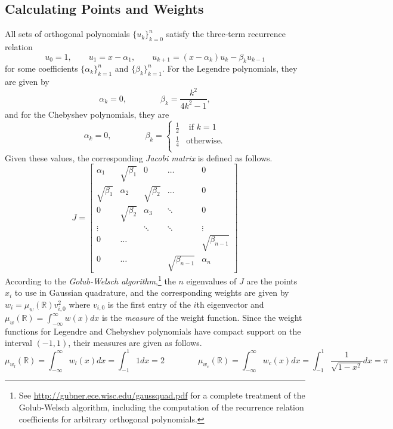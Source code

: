 \subsection*{Calculating Points and Weights} %


All sets of orthogonal polynomials $\{u_k\}_{k=0}^{n}$ satisfy the three-term recurrence relation
\[
u_0=1,\qquad u_1 = x - \alpha_1,\qquad u_{k+1} = (x-\alpha_k)u_k - \beta_ku_{k-1}
\]
for some coefficients $\{\alpha_k\}_{k=1}^n$ and $\{\beta_k\}_{k=1}^n$.
For the Legendre polynomials, they are given by
\[
\alpha_k=0, \qquad\qquad \beta_k=\frac{k^2}{4k^2-1},
\]
and for the Chebyshev polynomials, they are
\[
\alpha_k=0, \qquad\qquad \beta_k=\begin{cases} \frac{1}{2} &\mbox{ if } k = 1\\ \frac{1}{4} &\text{otherwise.} \\ \end{cases}
\]
Given these values, the corresponding \emph{Jacobi matrix} is defined as follows.
\[
J = \begin{bmatrix}
\alpha_1 & \sqrt{\beta_1} & 0 & \dots & 0 \\
\sqrt{\beta_1} & \alpha_2 & \sqrt{\beta_2} & \dots & 0 \\
0 & \sqrt{\beta_2} & \alpha_3 &  \ddots & 0 \\
\vdots & & \ddots & \ddots & \vdots \\
0 & \dots & & & \sqrt{\beta_{n-1}} \\
0 & \dots & & \sqrt{\beta_{n-1}} & \alpha_n
\end{bmatrix}
\]
According to the \emph{Golub-Welsch algorithm},\footnote{See \url{http://gubner.ece.wisc.edu/gaussquad.pdf} for a complete treatment of the Golub-Welsch algorithm, including the computation of the recurrence relation coefficients for arbitrary orthogonal polynomials.} the $n$ eigenvalues of $J$ are the points $x_i$ to use in Gaussian quadrature, and the corresponding weights are given by $w_i=\mu_w(\mathbb{R})v_{i,0}^2$ where $v_{i,0}$ is the first entry of the $i$th eigenvector and
$\mu_w(\mathbb{R}) = \int_{-\infty}^\infty w(x)dx$ is the \emph{measure} of the weight function.
Since the weight functions for Legendre and Chebyshev polynomials have compact support on the interval $(-1, 1)$, their measures are given as follows.
\[
\mu_{w_l}(\mathbb{R}) = \int_{-\infty}^\infty w_l(x)dx = \int_{-1}^{1} 1dx = 2
\qquad \qquad
\mu_{w_c}(\mathbb{R}) = \int_{-\infty}^\infty w_c(x)dx = \int_{-1}^{1} \frac{1}{\sqrt{1 - x^2}} dx = \pi
\]

